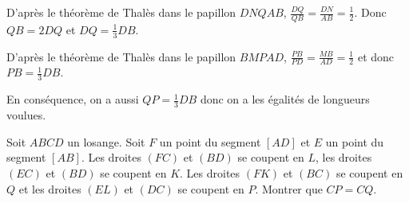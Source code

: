 \begin{sol}
\begin{center}
\end{center}

D'après le théorème de Thalès dans le papillon $DNQAB$, $\frac{DQ}{QB}=\frac{DN}{AB}=\frac1{2}$. Donc $QB=2DQ$ et $DQ=\frac1{3}DB$. 

D'après le théorème de Thalès dans le papillon $BMPAD$, $\frac{PB}{PD}=\frac{MB}{AD}=\frac1{2}$ et donc $PB=\frac1{3}DB$. 

En conséquence, on a aussi $QP=\frac1{3}DB$ donc on a les égalités de longueurs voulues. 

\end{sol}

\begin{exo}
Soit $ABCD$ un losange. Soit $F$ un point du segment $[AD]$ et $E$ un point du segment $[AB]$. Les droites $(FC)$ et $(BD)$ se coupent en $L$, les droites $(EC)$ et $(BD)$ se coupent en $K$. Les droites $(FK)$ et $(BC)$ se coupent en $Q$ et les droites $(EL)$ et $(DC)$ se coupent en $P$. Montrer que $CP=CQ$. 
\end{exo}

